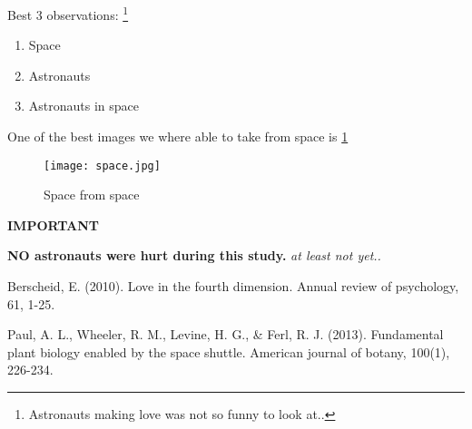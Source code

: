 \documentclass[12pt]{article} %
\begin{document}
Best 3 observations: \footnote{Astronauts making love was not so funny to look at..}
\begin{enumerate} %
    \item Space
    \item Astronauts 
    \item Astronauts in space 
\end{enumerate}

\newpage %

One of the best images we where able to take from space is \ref{fig:space}


\begin{figure}
    \centering %
    \texttt{[image: space.jpg]} %
    \caption{Space from space} %
    \label{fig:space} %
\end{figure}


\bigskip
\bigskip
\bigskip
\bigskip
\bigskip
\bigskip
\bigskip
\bigskip
\bigskip
\hline %
\smallskip
\textbf{IMPORTANT}

\bigskip
\textbf{NO astronauts were hurt during this study.}
\textit{at least not yet..}
\smallskip
\hline %

\newpage

\begin{thebibliography}{999}
    Berscheid, E. (2010). Love in the fourth dimension. Annual review of psychology, 61, 1-25.
    
    Paul, A. L., Wheeler, R. M., Levine, H. G., \& Ferl, R. J. (2013). Fundamental plant biology enabled by the space shuttle. American journal of botany, 100(1), 226-234.
\end{thebibliography}
\end{document}
